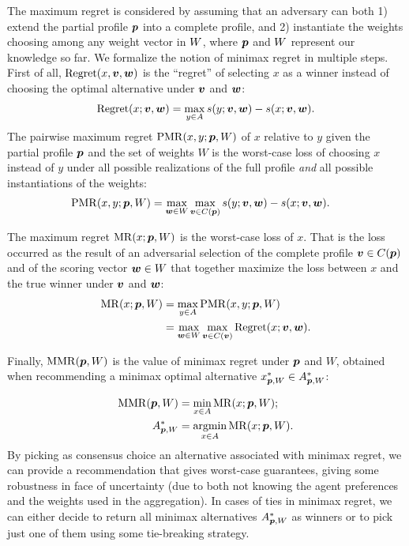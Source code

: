 \documentclass{article}
\begin{document}
The maximum regret is considered by assuming that an adversary can both 1) extend the partial profile ${\bm{p}}$ into a complete profile, and 2) instantiate the weights choosing among any weight vector in $W$, where ${\bm{p}}$ and $W$ represent our knowledge so far.
We formalize the notion of minimax regret in multiple steps.
First of all, $\operatorname{Regret}(x, \bm{v}, \bm{w})$ is the “regret” of selecting $x$ as a winner instead of choosing the optimal alternative under $\bm{v}$ and $\bm{w}$:
\begin{align} 
	\operatorname{Regret}(x; \bm{v}, \bm{w}) = \max_{y \in A} s(y; \bm{v},\bm{w}) - s(x; \bm{v}, \bm{w}).
\end{align}
The pairwise maximum regret $\operatorname{PMR}(x,y;{\bm{p}},W)$ of $x$ relative to $y$ given the partial profile ${\bm{p}}$ and the set of weights $W$
is the worst-case loss of choosing $x$ instead of $y$ under all possible realizations of the full profile {\em and} all possible instantiations of the weights:
\begin{align}
	\operatorname{PMR}(x,y; {\bm{p}}, W) & = \max_{\bm{w} \in W} \max_{\bm{v} \in C({\bm{p}})} s(y; \bm{v},\bm{w}) - s(x; \bm{v},\bm{w}).
\end{align}

The maximum regret $\operatorname{MR}(x;{\bm{p}},W)$ is the worst-case loss of $x$. That is the loss occurred as the result of an adversarial selection of the complete profile $\bm{v} \in C({\bm{p}})$ and of the scoring vector $\bm{w} \in W$ that together maximize the loss between $x$ and the true winner under $\bm{v}$ and $\bm{w}$:
\begin{align}
	\operatorname{MR}(x; {\bm{p}}, W) & = \max_{y \in A} \operatorname{PMR}(x,y; {\bm{p}}, W)\\
	& = \max_{\bm{w} \in W} \max_{\bm{v} \in C(\bm{v})} \operatorname{Regret}(x; \bm{v}, \bm{w}).
\end{align}

Finally,  $\operatorname{MMR}({\bm{p}},W)$ is the value of minimax regret under ${\bm{p}}$ and $W$, obtained when recommending a minimax optimal alternative $x^*_{{\bm{p}}, W} \in A^*_{{\bm{p}}, W}$:

\begin{align}
	\operatorname{MMR}({\bm{p}},W) & = \min_{x \in A} \operatorname{MR}(x;{\bm{p}},W); \\
	A^*_{{\bm{p}}, W} & = \operatorname*{argmin}_{x \in A} \operatorname{MR}(x;{\bm{p}},W).
\end{align}
By picking as consensus choice
an alternative associated with minimax regret, we can provide a recommendation that gives worst-case guarantees, giving some robustness in face of uncertainty (due to both not knowing the agent preferences and the weights used in the aggregation). 
In cases of ties in minimax regret, we can either decide to return all minimax alternatives $A^*_{{\bm{p}}, W}$ as winners or to pick just one of them using some tie-breaking strategy.
\end{document}
